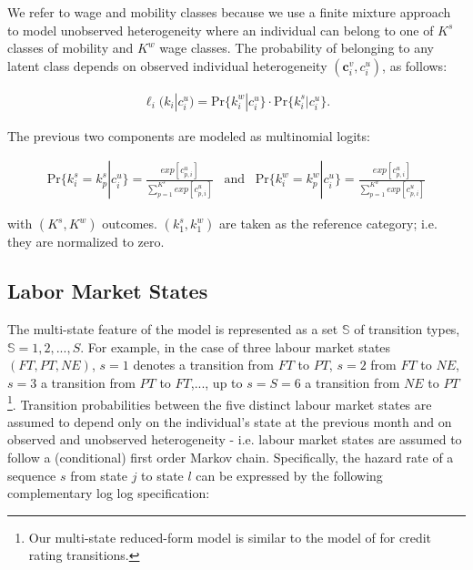 \documentclass[12pt, a4paper]{article}
\begin{document}
We refer to wage and mobility classes because we use a finite mixture approach to
model unobserved heterogeneity where an individual can belong to one of $K^{s}$ classes of mobility and $K^w$ wage classes. The probability of belonging to any latent class depends on observed individual heterogeneity $(\textbf{c}_i^v,c_i^u)$, as follows:

\begin{align}\label{eq:prob_unobs_het}
\ell_{i}(k_i|c_i^u)=\text{Pr}\{k_i^w|c_i^u\}\cdot\text{Pr}\{k_i^s|c_i^u\}.
\end{align}

The previous two components are modeled as multinomial logits:


\begin{align}\label{eq:prob_unobs_het_multin}
\text{Pr}\{k_i^{s}=k_{p}^{s}|c_{i}^u\}=\frac{exp[c_{p,i}^{u}]}{\sum\limits_{p=1}^{K^{s}}exp[c_{p,i}^{u}]} \,\,\,\,\, \text{and} \,\,\,\,\, \text{Pr}\{k_i^w=k_{p}^{w}|c_i^u\}=\frac{exp[c_{p,i}^{u}]}{\sum\limits_{p=1}^{K^w}exp[c_{p,i}^{u}]}
\end{align}


with $(K^{s},K^w)$ outcomes.  $(k^{s}_1,k^w_1)$ are taken as the reference category; i.e. they are normalized to zero.

\subsection{Labor Market States}\label{sec:lab_market_states}

The multi-state feature of the model is represented as a set $\mathbb{S}$ of transition types, $\mathbb{S}=1,2,...,S$. For example, in the case of three labour market states $(FT, PT, NE)$, $s=1$ denotes a transition from $FT$ to $PT$, $s=2$ from $FT$ to $NE$, $s=3$ a transition from $PT$ to $FT$,..., up to $s=S=6$ a transition from $NE$ to $PT$\footnote{Our multi-state reduced-form model is similar to the model of \cite{KoopLuMon08} for credit rating transitions.}. Transition probabilities between the five distinct labour market states are assumed to depend only on the individual's state at the previous month and on observed and unobserved heterogeneity - i.e. labour market states are assumed to follow a (conditional) first order Markov chain. Specifically, the hazard rate of a sequence $s$ from state $j$ to state $l$ can be expressed by the following complementary log log specification:
\end{document}
